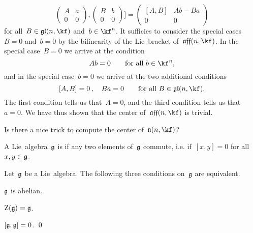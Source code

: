 \begin{example}
\begin{enumerate}
\[\begin{pmatrix}
						A & a \\
						0 & 0
					\end{pmatrix}
					,
					\begin{pmatrix}
						B & b \\
						0 & 0
					\end{pmatrix}
				\Biggr]
				=
				\begin{pmatrix}
					[A, B]  & A b - B a \\
					0       & 0
				\end{pmatrix}
			\]
			for all~$B \in \gllie(n, \kf)$ and~$b \in \kf^n$.
			It sufficies to consider the special cases~$B = 0$ and~$b = 0$ by the bilinearity of the Lie~bracket of~$\afflie(n, \kf)$. 
			In the special case~$B = 0$ we arrive at the condition
			\[
				A b = 0
				\qquad
				\text{for all~$b \in \kf^n$,}
			\]
			and in the special case~$b = 0$ we arrive at the two additional conditions
			\[
				[A, B] = 0 \,,
				\quad
				B a = 0
				\qquad
				\text{for all~$B \in \gllie(n, \kf)$}.
			\]
			The first condition tells us that~$A = 0$, and the third condition tells us that~$a = 0$.
			We have thus shown that the center of~$\afflie(n, \kf)$ is trivial.
	\end{enumerate}
\end{example}


\begin{question}
	Is there a nice trick to compute the center of~$\upperlie(n, \kf)$?
\end{question}


\begin{definition}
	A Lie~algebra~$\mathfrak{g}$ is  if any two elements of~$\mathfrak{g}$ commute, i.e. if~$[x,y] = 0$ for all~$x, y \in \mathfrak{g}$.
\end{definition}

\begin{proposition}

	Let~$\mathfrak{g}$ be a Lie~algebra.
	The following three conditions on~$\mathfrak{g}$ are equivalent.
	\begin{equivalenceslist}
		\item
			$\mathfrak{g}$ is abelian.
		\item
			$\operatorname{Z}(\mathfrak{g}) = \mathfrak{g}$.
		\item
			$[\mathfrak{g}, \mathfrak{g}] = 0$.
		\qed
	\end{equivalenceslist}
\end{proposition}


